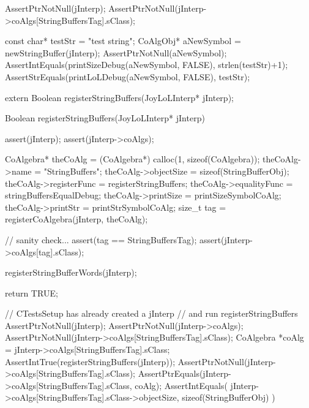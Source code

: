 
\startCTest
  AssertPtrNotNull(jInterp);
  AssertPtrNotNull(jInterp->coAlgs[StringBuffersTag].sClass);

  const char* testStr = "test string";
  CoAlgObj* aNewSymbol = newStringBuffer(jInterp);
  AssertPtrNotNull(aNewSymbol);
  AssertIntEquals(printSizeDebug(aNewSymbol, FALSE), strlen(testStr)+1);
  AssertStrEquals(printLoLDebug(aNewSymbol, FALSE), testStr);
\stopCTest
\skipTestCase
\stopTestSuite

\startTestSuite[registerStringBuffers]

\startCHeader
extern Boolean registerStringBuffers(JoyLoLInterp* jInterp);
\stopCHeader
{}

\startCCode
Boolean registerStringBuffers(JoyLoLInterp* jInterp) {
  assert(jInterp);
  assert(jInterp->coAlgs);
  
  CoAlgebra* theCoAlg    = (CoAlgebra*) calloc(1, sizeof(CoAlgebra));
  theCoAlg->name         = "StringBuffers";
  theCoAlg->objectSize   = sizeof(StringBufferObj);
  theCoAlg->registerFunc = registerStringBuffers;
  theCoAlg->equalityFunc = stringBuffersEqualDebug;
  theCoAlg->printSize    = printSizeSymbolCoAlg;
  theCoAlg->printStr     = printStrSymbolCoAlg;
  size_t tag = registerCoAlgebra(jInterp, theCoAlg);
  
  // sanity check...
  assert(tag == StringBuffersTag);
  assert(jInterp->coAlgs[tag].sClass);

  registerStringBufferWords(jInterp);

  return TRUE;
}
\stopCCode


\startCTest
  // CTestsSetup has already created a jInterp
  // and run registerStringBuffers
  AssertPtrNotNull(jInterp);
  AssertPtrNotNull(jInterp->coAlgs);
  AssertPtrNotNull(jInterp->coAlgs[StringBuffersTag].sClass);
  CoAlgebra *coAlg = jInterp->coAlgs[StringBuffersTag].sClass;
  AssertIntTrue(registerStringBuffers(jInterp));
  AssertPtrNotNull(jInterp->coAlgs[StringBuffersTag].sClass);
  AssertPtrEquals(jInterp->coAlgs[StringBuffersTag].sClass, coAlg);
  AssertIntEquals(
    jInterp->coAlgs[StringBuffersTag].sClass->objectSize,
    sizeof(StringBufferObj)
  )
\stopCTest
\stopTestCase
\stopTestSuite
